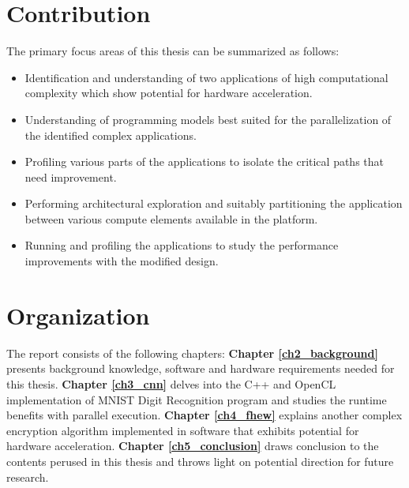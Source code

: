 \section{Contribution}
\label{sect1_2}
The primary focus areas of this thesis can be summarized as follows:
\begin{itemize}
\item Identification and understanding of two applications of high computational complexity which show potential for hardware acceleration.
\item Understanding of programming models best suited for the parallelization of the identified complex applications.
\item Profiling various parts of the applications to isolate the critical paths that need improvement.
\item Performing architectural exploration and suitably partitioning the application between various compute elements available in the platform.
\item Running and profiling the applications to study the performance improvements with the modified design.
\end{itemize}
\section{Organization}
\label{sect1_3}
The report consists of the following chapters: 
\textbf{Chapter \ref{ch2_background}} presents background knowledge, software and hardware requirements needed for this thesis. 
\textbf{Chapter \ref{ch3_cnn}} delves into the C++ and OpenCL implementation of MNIST Digit Recognition program and studies the runtime benefits with parallel execution.
\textbf{Chapter \ref{ch4_fhew}} explains another complex encryption algorithm implemented in software that exhibits potential for hardware acceleration.
\textbf{Chapter \ref{ch5_conclusion}} draws conclusion to the contents perused in this thesis and throws light on potential direction for future research.